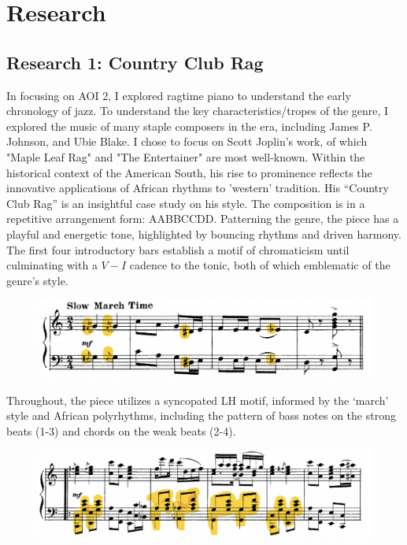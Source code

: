 \documentclass[12pt]{article}
\begin{document}
\section{Research}

\subsection{Research 1: Country Club Rag}

In focusing on AOI 2, I explored ragtime piano to understand the early chronology of jazz. To understand the key characteristics/tropes of the genre, I explored the music of many staple composers in the era, including James P. Johnson, and Ubie Blake. I chose to focus on Scott Joplin’s work, of which "Maple Leaf Rag" and "The Entertainer" are most well-known. Within the historical context of the American South, his rise to prominence reflects the innovative applications of African rhythms to 'western' tradition.\autocite[45]{joplinArticle}
His “Country Club Rag” is an insightful case study on his style. The composition is in a repetitive arrangement form: AABBCCDD. Patterning the genre, the piece has a playful and energetic tone, highlighted by bouncing rhythms and driven harmony. The first four introductory bars establish a motif of chromaticism until culminating with a $V-I$ cadence to the tonic, both of which emblematic of the genre's style.
\begin{figure}[H]
\begin{center}
\includegraphics[width=0.7\linewidth]{joplin1}
\end{center}
\end{figure}
Throughout, the piece utilizes a syncopated LH motif, informed by the ‘march’ style and African polyrhythms, including the pattern of bass notes on the strong beats (1-3) and chords on the weak beats (2-4). 
\begin{figure}[H]
\begin{center}
\includegraphics[width=0.7\linewidth]{joplin2}
\end{center}
\end{figure}
\end{document}

